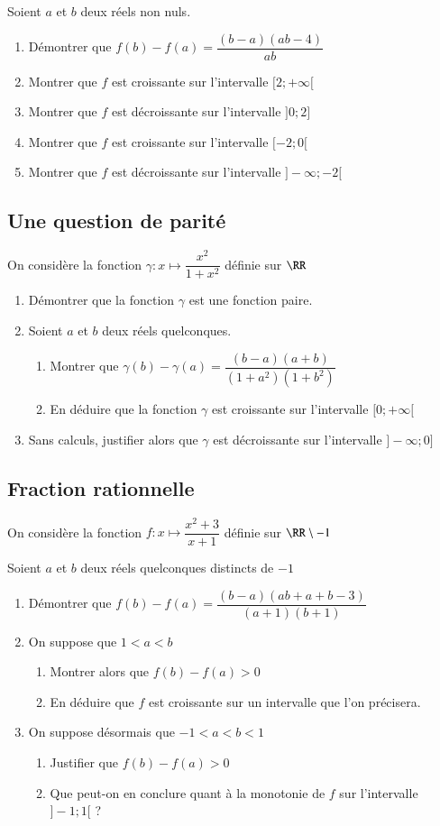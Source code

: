 \documentclass[oneside,12pt]{article}          %
\begin{document}
Soient $a$ et $b$ deux réels non nuls.
\begin{enumerate}
	\item Démontrer que $f(b)-f(a)=\dfrac{(b-a)(ab-4)}{ab}$
	\item Montrer que $f$ est croissante sur l'intervalle $[2;+\infty[$
	\item Montrer que $f$ est décroissante sur l'intervalle $]0;2]$
	\item Montrer que $f$ est croissante sur l'intervalle $[-2;0[$
	\item Montrer que $f$ est décroissante sur l'intervalle $]-\infty;-2[$
\end{enumerate}



\subsection{Une question de parité}
On considère la fonction $\gamma:x\mapsto \dfrac{x^2}{1+x^2}$ définie sur $\RR$
\begin{enumerate}
	\item Démontrer que la fonction $\gamma$ est une fonction paire.
	\item Soient $a$ et $b$ deux réels quelconques.
	\begin{enumerate}
		\item Montrer que $\gamma(b)-\gamma(a)=\dfrac{(b-a)(a+b)}{(1+a^2)(1+b^2)}$
		\item En déduire que la fonction $\gamma$ est croissante sur l'intervalle $[0;+\infty[$
	\end{enumerate}
	\item Sans calculs, justifier alors que $\gamma$ est décroissante sur l'intervalle $]-\infty;0]$
\end{enumerate}



\subsection{Fraction rationnelle}
On considère la fonction $f:x\mapsto\dfrac{x^2+3}{x+1}$ définie sur $\RR\setminus{-1}$

Soient $a$ et $b$ deux réels quelconques distincts de $-1$
\begin{enumerate}
	\item Démontrer que $f(b)-f(a)=\dfrac{(b-a)(ab+a+b-3)}{(a+1)(b+1)}$
	\item On suppose que $1<a<b$
	\begin{enumerate}
		\item Montrer alors que $f(b)-f(a)>0$
		\item En déduire que $f$ est croissante sur un intervalle que l'on précisera.
	\end{enumerate}
	\item On suppose désormais que $-1<a<b<1$
	\begin{enumerate}
		\item Justifier que $f(b)-f(a) >0$
		\item Que peut-on en conclure quant à la monotonie de $f$ sur l'intervalle $]-1;1[$ ?
	\end{enumerate}
\end{enumerate}
\end{document}
